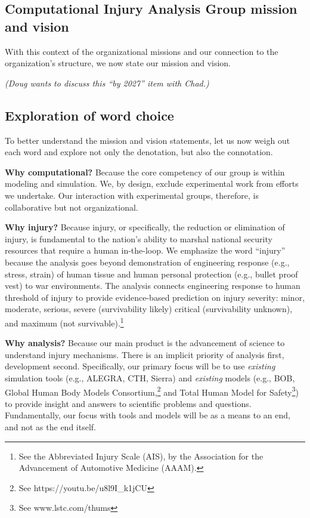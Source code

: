 \documentclass[12pt,reqno]{amsart}
\begin{document}
\subsection{Computational Injury Analysis Group mission and vision}
With this context
of the organizational missions and our connection to the organization's
structure, we now state our mission and vision.

\vspace{0.5cm}

\vspace{0.5cm}
{\em
(Doug wants to discuss this ``by 2027'' item with Chad.)
}

\subsection{Exploration of word choice}
To better understand the mission and vision statements, let us now 
weigh out each word and explore not only the denotation, but also the
connotation.

{\bf Why computational?}  Because the core competency of our group is 
within modeling and simulation.  We, by design, exclude 
experimental work from efforts we undertake.  Our interaction with 
experimental groups, therefore, is collaborative but not organizational.

{\bf Why injury?}  Because injury, or specifically, the reduction or 
elimination of injury, is fundamental to the nation's ability to marshal 
national security resources that require a human in-the-loop.   We emphasize 
the word ``injury'' because the analysis goes beyond demonstration of 
engineering response (e.g., stress, strain) of human tissue and human 
personal protection (e.g., bullet proof vest) to war environments.  
The analysis connects engineering response to human threshold of injury 
to provide evidence-based prediction on injury severity: minor, moderate, 
serious, severe (survivability likely) critical (survivability unknown), 
and maximum (not 
survivable).\footnote{See the Abbreviated Injury Scale (AIS), 
by the Association for the Advancement of Automotive Medicine (AAAM).}

{\bf Why analysis?}  Because our main product is the advancement of science 
to understand injury mechanisms.  There is an implicit priority of 
analysis first, development second.  Specifically, our primary focus will be 
to use {\em existing} simulation tools (e.g., ALEGRA, CTH, Sierra) and
{\em existing} models (e.g., BOB, Global Human Body Models 
Consortium,\footnote{See https://youtu.be/u8l9I\_k1jCU} and 
Total Human Model for Safety\footnote{See www.lstc.com/thums}) to
provide insight and answers to scientific problems and questions.
Fundamentally, our focus with tools and models will be as a means 
to an end, and not as the end itself. 
\end{document}
